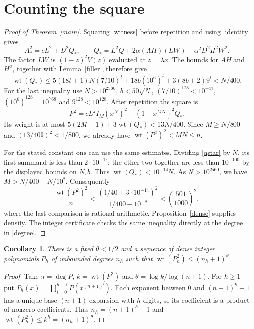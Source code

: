 \documentclass[10pt,a4paper,reqno]{amsart}
\newtheorem{corollary}[theorem]{Corollary}
\newcommand{\wt}{\operatorname{wt}}
\begin{document}
\section{Counting the square}\label{sec:count}
\begin{proof}[Proof of Theorem~\ref{main}]
Squaring \eqref{witness} before repetition and using \eqref{identity} gives
\[
 A_*^2=cL^2+D^2Q_*,\qquad
 Q_*=L^2Q+2\alpha(AH)(LW)+\alpha^2 D^2H^2W^2 .
\]
The factor $LW$ is $(1-z)^2V(z)$ evaluated at $z=\lambda x$. The bounds for $AH$ and $H^2$, together with Lemma~\ref{filler}, therefore give
\begin{equation}\label{qstar}
 \wt(Q_*)\le5(18t+1)N(7/10)^t+18b(10^6)^t+3(8b+2)9^t<N/400 .
\end{equation}
For the last inequality use $N>10^{2560}$, $b<50\sqrt N$, $(7/10)^{128}<10^{-19}$, $(10^6)^{128}=10^{768}$ and $9^{128}<10^{128}$. After repetition the square is
\[
                  P^2=cL^2 I_M(x^N)^2+(1-x^{MN})^2Q_* .
\]
Its weight is at most $5(2M-1)+3\wt(Q_*)<13N/400$. Since $M\ge N/800$ and $(13/400)^2<1/800$, we already have $\wt(P^2)^2<MN\le n$.

For the stated constant one can use the same estimates. Dividing \eqref{qstar} by $N$, its first summand is less than $2\cdot10^{-15}$; the other two together are less than $10^{-400}$ by the displayed bounds on $N,b$. Thus $\wt(Q_*)<10^{-14}N$. As $N>10^{2560}$, we have $M>N/400-N/10^8$. Consequently
\[
 \frac{\wt(P^2)^2}{n}<
 \frac{(1/40+3\cdot10^{-14})^2}{1/400-10^{-8}}
 <\left(\frac{501}{1000}\right)^2 ,
\]
where the last comparison is rational arithmetic. Proposition~\ref{dense} supplies density. The integer certificate checks the same inequality directly at the degree in \eqref{degree}.
\end{proof}

\begin{corollary}\label{powers}
There is a fixed $\theta<1/2$ and a sequence of dense integer polynomials $P_h$ of unbounded degrees $n_h$ such that $\wt(P_h^2)\le(n_h+1)^\theta$.
\end{corollary}
\begin{proof}
Take $n=\deg P$, $k=\wt(P^2)$ and $\theta=\log k/\log(n+1)$. For $h\ge1$ put $P_h(x)=\prod_{i=0}^{h-1}P(x^{(n+1)^i})$. Each exponent between $0$ and $(n+1)^h-1$ has a unique base-$(n+1)$ expansion with $h$ digits, so its coefficient is a product of nonzero coefficients. Thus $n_h=(n+1)^h-1$ and $\wt(P_h^2)\le k^h=(n_h+1)^\theta$.
\end{proof}
\end{document}
